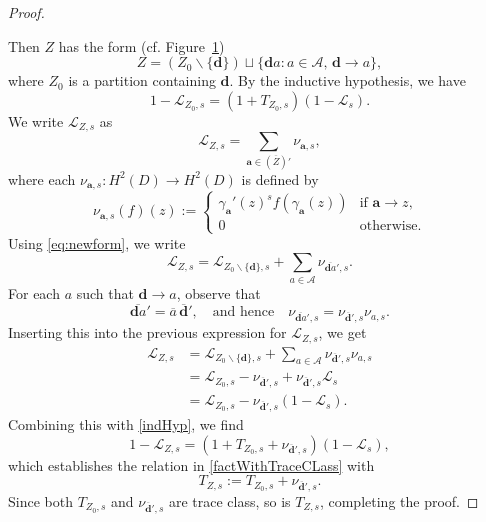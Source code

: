 \documentclass[12pt,letterpaper]{amsart}
\theoremstyle{plain}
\theoremstyle{definition}
\theoremstyle{remark}
\newcommand{\Aa}{\textbf{a}}
\begin{document}
\begin{proof}
\begin{figure}[h!]
\label{fig:my-tree}
\end{figure}
Then $Z$ has the form (cf. Figure~\ref{fig:my-tree})
\begin{equation}\label{eq:newform}
Z = (Z_0 \smallsetminus \{\textbf{d}\}) \sqcup \{ \textbf{d}a : a \in \mathcal{A},\, \textbf{d} \to a \},
\end{equation}
where $Z_0$ is a partition containing $\textbf{d}$. By the inductive hypothesis, we have
\begin{equation}\label{indHyp}
1 - \mathcal{L}_{Z_0,s} = (1 + T_{Z_0,s})(1 - \mathcal{L}_s).
\end{equation}
We write $\mathcal{L}_{Z,s}$ as
\[
\mathcal{L}_{Z,s} = \sum_{\Aa \in (\overline{Z})'} \nu_{\Aa,s},
\]
where each $\nu_{\Aa,s} \colon H^2(D) \to H^2(D)$ is defined by
\[
\nu_{\Aa,s}(f)(z) :=
\begin{cases}
\gamma_\Aa'(z)^s f(\gamma_\Aa(z)) & \text{if } \Aa \to z, \\
0 & \text{otherwise}.
\end{cases}
\]
Using \eqref{eq:newform}, we write
\[
\mathcal{L}_{Z,s} = \mathcal{L}_{Z_0 \smallsetminus \{ \textbf{d} \},s} + \sum_{a \in \mathcal{A}} \nu_{\overline{\textbf{d}a}',s}.
\]
For each $a$ such that $\textbf{d} \to a$, observe that
\[
\overline{\textbf{d}a}' = \overline{a} \, \overline{\textbf{d}}',
\quad \text{and hence} \quad
\nu_{\overline{\textbf{d}a}',s} = \nu_{\overline{\textbf{d}}',s} \nu_{a,s}.
\]
Inserting this into the previous expression for $\mathcal{L}_{Z,s}$, we get
\begin{align*}
\mathcal{L}_{Z,s}
&= \mathcal{L}_{Z_0 \smallsetminus \{ \textbf{d} \},s} + \sum_{a \in \mathcal{A}} \nu_{\overline{\textbf{d}}',s} \nu_{a,s} \\
&= \mathcal{L}_{Z_0,s} - \nu_{\overline{\textbf{d}}',s} + \nu_{\overline{\textbf{d}}',s} \mathcal{L}_s \\
&= \mathcal{L}_{Z_0,s} - \nu_{\overline{\textbf{d}}',s}(1 - \mathcal{L}_s).
\end{align*}
Combining this with \eqref{indHyp}, we find
\[
1 - \mathcal{L}_{Z,s} = \left(1 + T_{Z_0,s} + \nu_{\overline{\textbf{d}}',s}\right)(1 - \mathcal{L}_s),
\]
which establishes the relation in \eqref{factWithTraceCLass} with
\begin{equation}\label{eq:recursion}
T_{Z,s} := T_{Z_0,s} + \nu_{\overline{\textbf{d}}',s}.
\end{equation}
Since both $T_{Z_0,s}$ and $\nu_{\overline{\textbf{d}}',s}$ are trace class, so is $T_{Z,s}$, completing the proof.
\end{proof}
\end{document}
